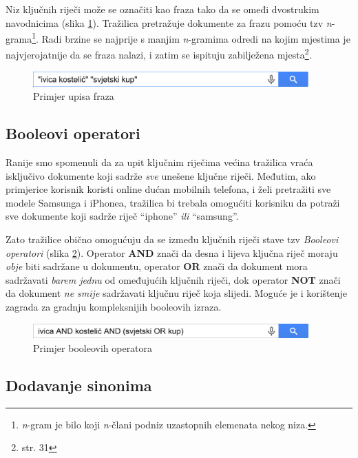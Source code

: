 \documentclass[a4paper,twoside,12pt]{scrreprt}
\begin{document}
Niz ključnih riječi može se označiti kao fraza tako da se omeđi dvostrukim navodnicima (slika \ref{phrases}). Tražilica pretražuje dokumente za frazu pomoću tzv \textit{n}-grama\footnote{\textit{n}-gram je bilo koji \textit{n}-člani podniz uzastopnih elemenata nekog niza.}. Radi brzine se najprije s manjim \textit{n}-gramima odredi na kojim mjestima je najvjerojatnije da se fraza nalazi, i zatim se ispituju zabilježena mjesta\footnote{\cite{taming} str. 31}.

\begin{figure}[H]
  \centering
  \includegraphics[width=300pt]{phrases}
  \caption{Primjer upisa fraza}
  \label{phrases}
\end{figure}

\subsection{Booleovi operatori}

Ranije smo spomenuli da za upit ključnim riječima većina tražilica vraća isključivo dokumente koji sadrže \textit{sve} unešene ključne riječi. Međutim, ako primjerice korisnik koristi online dućan mobilnih telefona, i želi pretražiti sve modele Samsunga i iPhonea, tražilica bi trebala omogućiti korisniku da potraži sve dokumente koji sadrže riječ ``iphone'' \textit{ili} ``samsung''.

Zato tražilice obično omogućuju da se između ključnih riječi stave tzv \textit{Booleovi operatori} (slika \ref{boolean}). Operator \textbf{AND} znači da desna i lijeva ključna riječ moraju \textit{obje} biti sadržane u dokumentu, operator \textbf{OR} znači da dokument mora sadržavati \textit{barem jednu} od omeđujućih ključnih riječi, dok operator \textbf{NOT} znači da dokument \textit{ne smije} sadržavati ključnu riječ koja slijedi. Moguće je i korištenje zagrada za gradnju kompleksnijih booleovih izraza.

\begin{figure}[H]
  \centering
  \includegraphics[width=300pt]{boolean}
  \caption{Primjer booleovih operatora}
  \label{boolean}
\end{figure}

\subsection{Dodavanje sinonima}
\end{document}
